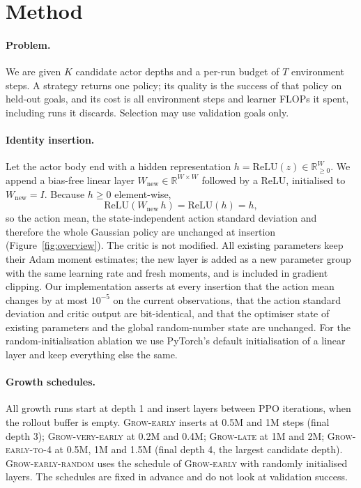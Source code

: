 \documentclass{article}
\newcommand{\growE}{\textsc{Grow-early}}
\newcommand{\growL}{\textsc{Grow-late}}
\newcommand{\growVE}{\textsc{Grow-very-early}}
\newcommand{\growF}{\textsc{Grow-early-to-4}}
\newcommand{\growR}{\textsc{Grow-early-random}}
\begin{document}
\section{Method}

\paragraph{Problem.}
We are given $K$ candidate actor depths and a per-run budget of $T$ environment steps.
A strategy returns one policy; its quality is the success of that policy on held-out goals, and its cost is all environment steps and learner FLOPs it spent, including runs it discards.
Selection may use validation goals only.

\paragraph{Identity insertion.}
Let the actor body end with a hidden representation $h = \mathrm{ReLU}(z) \in \mathbb{R}_{\ge 0}^{W}$.
We append a bias-free linear layer $W_{\text{new}} \in \mathbb{R}^{W\times W}$ followed by a ReLU, initialised to $W_{\text{new}} = I$.
Because $h \ge 0$ element-wise,
\begin{equation}
    \mathrm{ReLU}(W_{\text{new}}\, h) = \mathrm{ReLU}(h) = h ,
\end{equation}
so the action mean, the state-independent action standard deviation and therefore the whole Gaussian policy are unchanged at insertion (Figure~\ref{fig:overview}).
The critic is not modified.
All existing parameters keep their Adam \citep{kingma2015adam} moment estimates; the new layer is added as a new parameter group with the same learning rate and fresh moments, and is included in gradient clipping.
Our implementation asserts at every insertion that the action mean changes by at most $10^{-5}$ on the current observations, that the action standard deviation and critic output are bit-identical, and that the optimiser state of existing parameters and the global random-number state are unchanged.
For the random-initialisation ablation we use PyTorch's default initialisation of a linear layer \citep{he2015delving} and keep everything else the same.

\paragraph{Growth schedules.}
All growth runs start at depth 1 and insert layers between PPO iterations, when the rollout buffer is empty.
\growE{} inserts at 0.5M and 1M steps (final depth 3); \growVE{} at 0.2M and 0.4M; \growL{} at 1M and 2M; \growF{} at 0.5M, 1M and 1.5M (final depth 4, the largest candidate depth).
\growR{} uses the schedule of \growE{} with randomly initialised layers.
The schedules are fixed in advance and do not look at validation success.
\end{document}
